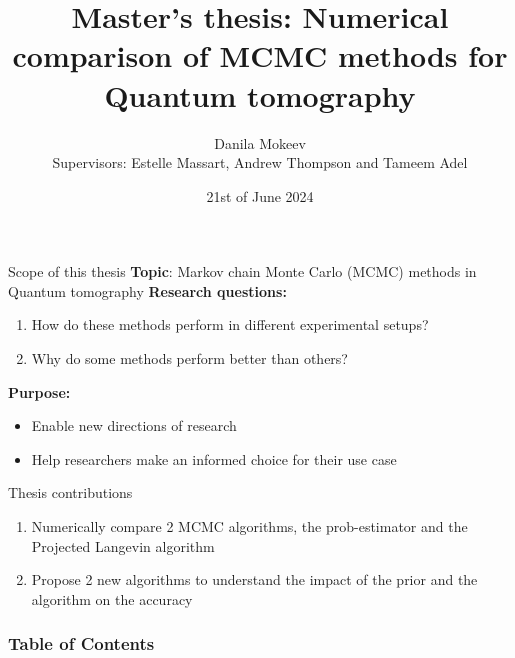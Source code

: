 \documentclass{beamer}
\title{Master's thesis: Numerical comparison of MCMC methods for Quantum tomography}
\author[Mokeev]
{ Danila Mokeev\\{\small Supervisors: Estelle Massart, Andrew Thompson and Tameem Adel}}
\institute[EPL]{Ecole Polytechnique de Louvain}
\date{21st of June 2024}
\newcommand{\tb}{\textbf}
\begin{document}
\frame{\titlepage}

\begin{frame}{Scope of this thesis}
    \tb{Topic}: Markov chain Monte Carlo (MCMC) methods in Quantum tomography\medbreak
    \tb{Research questions:} 
    \begin{enumerate}
        \item How do these methods perform in different experimental setups?
        \item Why do some methods perform better than others?
    \end{enumerate}
    \tb{Purpose:}
    \begin{itemize}
        \item Enable new directions of research
        \item Help researchers make an informed choice for their use case 
    \end{itemize}
\end{frame}
\begin{frame}{Thesis contributions}
    \begin{enumerate}
        \item Numerically compare 2 MCMC algorithms, the prob-estimator and the Projected Langevin algorithm
        \item Propose 2 new algorithms to understand the impact of the prior and the algorithm on the accuracy
    \end{enumerate}
\end{frame}

\begin{frame}
\frametitle{Table of Contents}
\tableofcontents
\end{frame}
\end{document}
